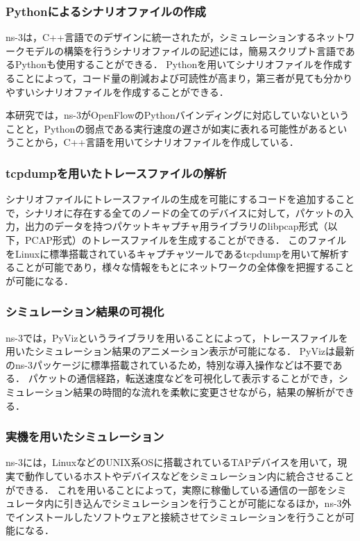 \subsubsection{Pythonによるシナリオファイルの作成}

ns-3は，C++言語でのデザインに統一されたが，シミュレーションするネットワークモデルの構築を行うシナリオファイルの記述には，簡易スクリプト言語であるPythonも使用することができる．
Pythonを用いてシナリオファイルを作成することによって，コード量の削減および可読性が高まり，第三者が見ても分かりやすいシナリオファイルを作成することができる．

本研究では，ns-3がOpenFlowのPythonバインディングに対応していないということと，Pythonの弱点である実行速度の遅さが如実に表れる可能性があるということから，C++言語を用いてシナリオファイルを作成している．

\subsubsection{tcpdumpを用いたトレースファイルの解析}

シナリオファイルにトレースファイルの生成を可能にするコードを追加することで，シナリオに存在する全てのノードの全てのデバイスに対して，パケットの入力，出力のデータを持つパケットキャプチャ用ライブラリのlibpcap形式（以下，PCAP形式）のトレースファイルを生成することができる．
このファイルをLinuxに標準搭載されているキャプチャツールであるtcpdumpを用いて解析することが可能であり，様々な情報をもとにネットワークの全体像を把握することが可能になる．

\subsubsection{シミュレーション結果の可視化}

ns-3では，PyVizというライブラリを用いることによって，トレースファイルを用いたシミュレーション結果のアニメーション表示が可能になる．
PyVizは最新のns-3パッケージに標準搭載されているため，特別な導入操作などは不要である．
パケットの通信経路，転送速度などを可視化して表示することができ，シミュレーション結果の時間的な流れを柔軟に変更させながら，結果の解析ができる．

\subsubsection{実機を用いたシミュレーション}

ns-3には，LinuxなどのUNIX系OSに搭載されているTAPデバイスを用いて，現実で動作しているホストやデバイスなどをシミュレーション内に統合させることができる．
これを用いることによって，実際に稼働している通信の一部をシミュレータ内に引き込んでシミュレーションを行うことが可能になるほか，ns-3外でインストールしたソフトウェアと接続させてシミュレーションを行うことが可能になる．

